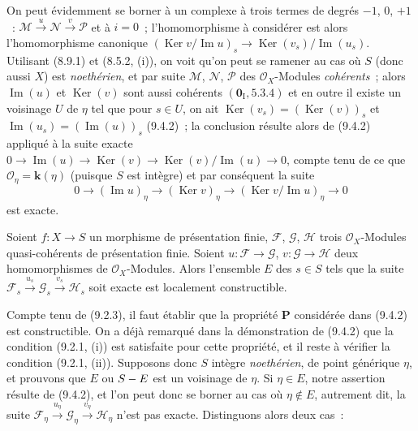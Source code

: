 
On peut évidemment se borner à un complexe à trois termes de degrés
$-1$, $0$, $+1$~:
$\mathcal M\xrightarrow{u}\mathcal N\xrightarrow{v}\mathcal P$
et à $i=0$~; l'homomorphisme à considérer est alors l'homomorphisme canonique
$(\operatorname{Ker}v/\operatorname{Im}u)_s\to
\operatorname{Ker}(v_s)/\operatorname{Im}(u_s)$. Utilisant (8.9.1) et
(8.5.2, (i)), on voit qu'on peut se ramener au cas où $S$ (donc aussi $X$)
est \emph{noethérien}, et par suite $\mathcal M$, $\mathcal N$, $\mathcal P$
des $\mathcal O_X$-Modules \emph{cohérents}~; alors
$\operatorname{Im}(u)$ et $\operatorname{Ker}(v)$ sont aussi cohérents
$(\mathbf 0_{\mathrm I},5.3.4)$ et en outre il existe un voisinage $U$ de
$\eta$ tel que pour $s\in U$, on ait
$\operatorname{Ker}(v_s)=(\operatorname{Ker}(v))_s$ et
$\operatorname{Im}(u_s)=(\operatorname{Im}(u))_s$ (9.4.2)~; la conclusion
résulte alors de (9.4.2) appliqué à la suite exacte
$0\to\operatorname{Im}(u)\to\operatorname{Ker}(v)\to
\operatorname{Ker}(v)/\operatorname{Im}(u)\to0$,
compte tenu de ce que $\mathcal O_\eta=\boldsymbol{k}(\eta)$ (puisque $S$ est intègre) et
par conséquent la suite
\[
0\to(\operatorname{Im}u)_\eta\to(\operatorname{Ker}v)_\eta\to
(\operatorname{Ker}v/\operatorname{Im}u)_\eta\to0
\]
est exacte.

\begin{proposition}[9.4.4]
\label{IV.9.4.4-fr}
Soient $f:X\to S$ un morphisme de présentation finie, $\mathcal F$,
$\mathcal G$, $\mathcal H$ trois $\mathcal O_X$-Modules quasi-cohérents de
présentation finie. Soient $u:\mathcal F\to\mathcal G$,
$v:\mathcal G\to\mathcal H$ deux homomorphismes de $\mathcal O_X$-Modules.
Alors l'ensemble $E$ des $s\in S$ tels que la suite
$\mathcal F_s\xrightarrow{u_s}\mathcal G_s
\xrightarrow{v_s}\mathcal H_s$ soit exacte est localement constructible.
\end{proposition}

Compte tenu de (9.2.3), il faut établir que la propriété $\boldsymbol{P}$ considérée
dans (9.4.2) est constructible. On a déjà remarqué dans la démonstration de
(9.4.2) que la condition (9.2.1, (i)) est satisfaite pour cette propriété, et
il reste à vérifier la condition (9.2.1, (ii)). Supposons donc $S$ intègre
\emph{noethérien}, de point générique $\eta$, et prouvons que $E$ ou $S- E$ est un
voisinage de $\eta$. Si $\eta\in E$, notre assertion résulte de (9.4.2), et
l'on peut donc se borner au cas où $\eta\notin E$, autrement dit, la suite
$\mathcal F_\eta\xrightarrow{u_\eta}\mathcal G_\eta
\xrightarrow{v_\eta}\mathcal H_\eta$ n'est pas exacte. Distinguons alors
deux cas~:

